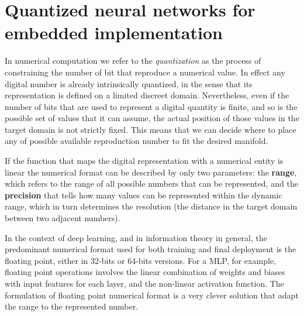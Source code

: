 \section{Quantized neural networks for embedded implementation}
\label{section:quantum}

In numerical computation we refer to the \textit{quantization} as the process of constraining the number of bit that reproduce a numerical value. In effect any digital number is already intrinsically quantized, in the sense that its representation is defined on a limited discreet domain. Nevertheless, even if the number of bits that are used to represent a digital quantity is finite, and so is the possible set of values that it can assume, the actual position of those values in the target domain is not strictly fixed. This means that we can decide where to place any of possible available reproduction number to fit the desired manifold.

If the function that maps the digital representation with a numerical entity is linear the numerical format can be described by only two parameters: the \textbf{range}, which refers to the range of all possible numbers that can be represented, and the \textbf{precision} that tells how many values can be represented within the dynamic range, which in turn determines the resolution (the distance in the target domain between two adjacent numbers).

In the context of deep learning, and in information theory in general, the predominant numerical format used for both training and final deployment is the floating point, either in 32-bits or 64-bits versions. For a \acs{MLP}, for example, floating point operations involves the linear combination of weights and biases with input features for each layer, and the non-linear activation function. The formulation of floating point numerical format is a very clever solution that adapt the range to the represented number.

